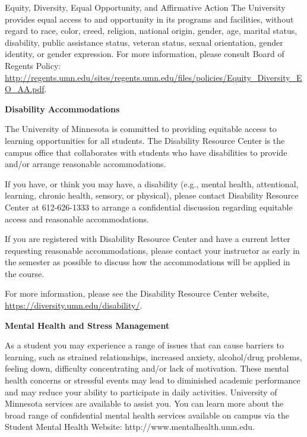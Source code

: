 \documentclass[11pt]{article}
\begin{document}
Equity, Diversity, Equal Opportunity, and Affirmative Action
The University provides equal access to and opportunity in its programs and facilities, without regard to race, color, creed, religion, national origin, gender, age, marital status, disability, public assistance status, veteran status, sexual orientation, gender identity, or gender expression. For more information, please consult Board of Regents Policy: \url{http://regents.umn.edu/sites/regents.umn.edu/files/policies/Equity_Diversity_EO_AA.pdf}.

\vspace{10pt}
\noindent\textbf{Disability Accommodations}

\hspace{3mm}
The University of Minnesota is committed to providing equitable access to learning opportunities for all students. The Disability Resource Center is the campus office that collaborates with students who have disabilities to provide and/or arrange reasonable accommodations.

If you have, or think you may have, a disability (e.g., mental health, attentional, learning, chronic health, sensory, or physical), please contact Disability Resource Center at 612-626-1333 to arrange a confidential discussion regarding equitable access and reasonable accommodations.

If you are registered with Disability Resource Center and have a current letter requesting reasonable accommodations, please contact your instructor as early in the semester as possible to discuss how the accommodations will be applied in the course.

For more information, please see the Disability Resource Center website, \url{https://diversity.umn.edu/disability/}.

\vspace{10pt}
\noindent\textbf{Mental Health and Stress Management}

\hspace{3mm}
As a student you may experience a range of issues that can cause barriers to learning, such as strained relationships, increased anxiety, alcohol/drug problems, feeling down, difficulty concentrating and/or lack of motivation. These mental health concerns or stressful events may lead to diminished academic performance and may reduce your ability to participate in daily activities. University of Minnesota services are available to assist you. You can learn more about the broad range of confidential mental health services available on campus via the Student Mental Health Website: http://www.mentalhealth.umn.edu.
\end{document}
